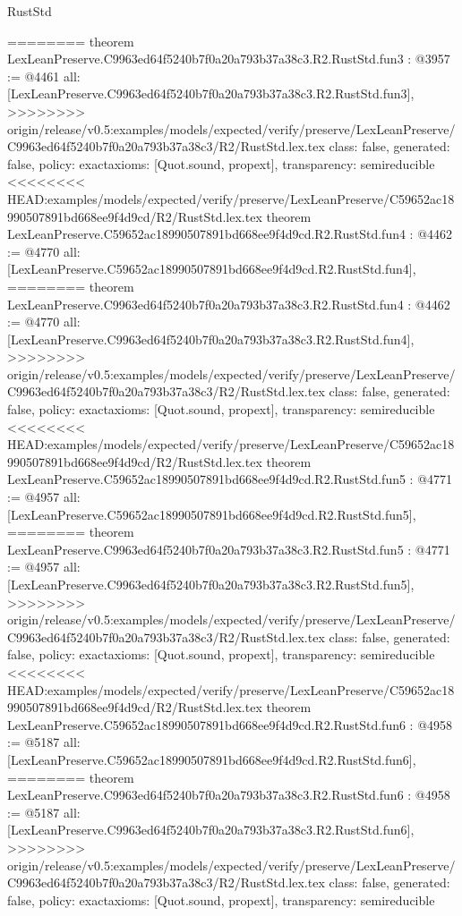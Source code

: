 \begin{lexlean}{RustStd}
\begin{coremodule}
{\begin{coremodule}
{{{{{{========
theorem LexLeanPreserve.C9963ed64f5240b7f0a20a793b37a38c3.R2.RustStd.fun3 : @3957 := @4461 {
  all: [LexLeanPreserve.C9963ed64f5240b7f0a20a793b37a38c3.R2.RustStd.fun3],
>>>>>>>> origin/release/v0.5:examples/models/expected/verify/preserve/LexLeanPreserve/C9963ed64f5240b7f0a20a793b37a38c3/R2/RustStd.lex.tex
  class: false,
  generated: false,
  policy: exact{axioms: [Quot.sound, propext]},
  transparency: semireducible
}
<<<<<<<< HEAD:examples/models/expected/verify/preserve/LexLeanPreserve/C59652ac18990507891bd668ee9f4d9cd/R2/RustStd.lex.tex
theorem LexLeanPreserve.C59652ac18990507891bd668ee9f4d9cd.R2.RustStd.fun4 : @4462 := @4770 {
  all: [LexLeanPreserve.C59652ac18990507891bd668ee9f4d9cd.R2.RustStd.fun4],
========
theorem LexLeanPreserve.C9963ed64f5240b7f0a20a793b37a38c3.R2.RustStd.fun4 : @4462 := @4770 {
  all: [LexLeanPreserve.C9963ed64f5240b7f0a20a793b37a38c3.R2.RustStd.fun4],
>>>>>>>> origin/release/v0.5:examples/models/expected/verify/preserve/LexLeanPreserve/C9963ed64f5240b7f0a20a793b37a38c3/R2/RustStd.lex.tex
  class: false,
  generated: false,
  policy: exact{axioms: [Quot.sound, propext]},
  transparency: semireducible
}
<<<<<<<< HEAD:examples/models/expected/verify/preserve/LexLeanPreserve/C59652ac18990507891bd668ee9f4d9cd/R2/RustStd.lex.tex
theorem LexLeanPreserve.C59652ac18990507891bd668ee9f4d9cd.R2.RustStd.fun5 : @4771 := @4957 {
  all: [LexLeanPreserve.C59652ac18990507891bd668ee9f4d9cd.R2.RustStd.fun5],
========
theorem LexLeanPreserve.C9963ed64f5240b7f0a20a793b37a38c3.R2.RustStd.fun5 : @4771 := @4957 {
  all: [LexLeanPreserve.C9963ed64f5240b7f0a20a793b37a38c3.R2.RustStd.fun5],
>>>>>>>> origin/release/v0.5:examples/models/expected/verify/preserve/LexLeanPreserve/C9963ed64f5240b7f0a20a793b37a38c3/R2/RustStd.lex.tex
  class: false,
  generated: false,
  policy: exact{axioms: [Quot.sound, propext]},
  transparency: semireducible
}
<<<<<<<< HEAD:examples/models/expected/verify/preserve/LexLeanPreserve/C59652ac18990507891bd668ee9f4d9cd/R2/RustStd.lex.tex
theorem LexLeanPreserve.C59652ac18990507891bd668ee9f4d9cd.R2.RustStd.fun6 : @4958 := @5187 {
  all: [LexLeanPreserve.C59652ac18990507891bd668ee9f4d9cd.R2.RustStd.fun6],
========
theorem LexLeanPreserve.C9963ed64f5240b7f0a20a793b37a38c3.R2.RustStd.fun6 : @4958 := @5187 {
  all: [LexLeanPreserve.C9963ed64f5240b7f0a20a793b37a38c3.R2.RustStd.fun6],
>>>>>>>> origin/release/v0.5:examples/models/expected/verify/preserve/LexLeanPreserve/C9963ed64f5240b7f0a20a793b37a38c3/R2/RustStd.lex.tex
  class: false,
  generated: false,
  policy: exact{axioms: [Quot.sound, propext]},
  transparency: semireducible
}}}}}}}}}}
\end{coremodule}}
\end{coremodule}
\end{lexlean}
